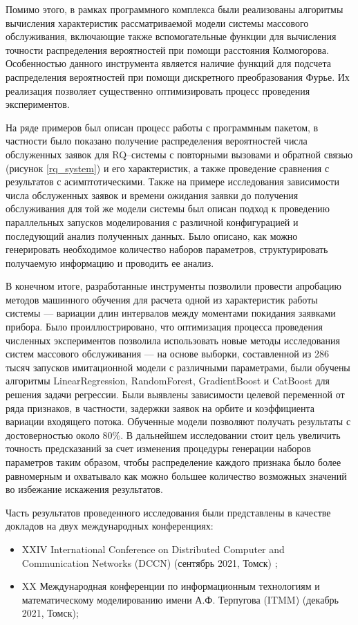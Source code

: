 Помимо этого, в рамках программного комплекса были реализованы алгоритмы вычисления характеристик рассматриваемой модели системы массового обслуживания, включающие также вспомогательные функции для вычисления точности распределения вероятностей при помощи расстояния Колмогорова. Особенностью данного инструмента является наличие функций для подсчета распределения вероятностей при помощи дискретного преобразования Фурье. Их реализация позволяет существенно оптимизировать процесс проведения экспериментов.

На ряде примеров был описан процесс работы с программным пакетом, в частности было показано получение распределения вероятностей числа обслуженных заявок для RQ--системы с повторными вызовами и обратной связью (рисунок \ref{rq_system}) и его характеристик, а также проведение сравнения с результатов с асимптотическими. Также на примере исследования зависимости числа обслуженных заявок и времени ожидания заявки до получения обслуживания для той же модели системы был описан подход к проведению параллельных запусков моделирования с различной конфигурацией и последующий анализ полученных данных. Было описано, как можно генерировать необходимое количество наборов параметров, структурировать получаемую информацию и проводить ее анализ.

В конечном итоге, разработанные инструменты позволили провести апробацию методов машинного обучения для расчета одной из характеристик работы системы --- вариации длин интервалов между моментами покидания заявками прибора. Было проиллюстрировано, что оптимизация процесса проведения численных экспериментов позволила использовать новые методы исследования систем массового обслуживания --- на основе выборки, составленной из 286 тысяч запусков имитационной модели с различными параметрами, были обучены алгоритмы LinearRegression, RandomForest, GradientBoost и CatBoost для решения задачи регрессии. Были выявлены зависимости целевой переменной от ряда признаков, в частности, задержки заявок на орбите и коэффициента вариации входящего потока. Обученные модели позволяют получать результаты с достоверностью около 80\%. В дальнейшем исследовании стоит цель увеличить точность предсказаний за счет изменения процедуры генерации наборов параметров таким образом, чтобы распределение каждого признака было более равномерным и охватывало как можно большее количество возможных значений во избежание искажения результатов.

Часть результатов проведенного исследования были представлены в качестве докладов на двух международных конференциях:
\begin{itemize}
	\item XXIV International Conference on Distributed Computer and Communication Networks (DCCN) (сентябрь 2021, Томск) \cite{blaginin2021approximation};
	\item XX Международная конференции по информационным технологиям и математическому моделированию имени А.Ф. Терпугова (ITMM) (декабрь 2021, Томск);
\end{itemize}

 \clearpage
